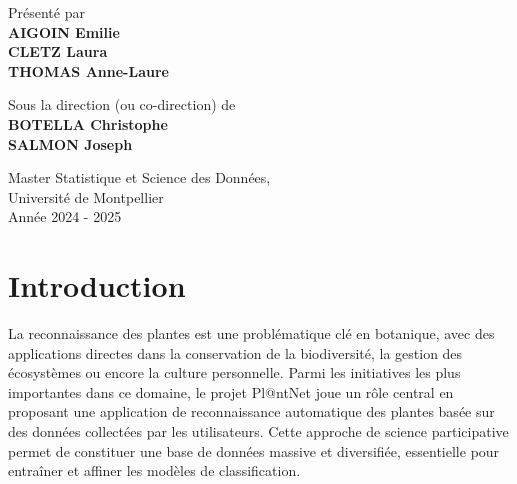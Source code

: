 \documentclass[a4paper,12pt]{article}
\begin{document}
\vfill
\begin{center}
Présenté par \\ \vspace{0.2cm}
    {\textbf{AIGOIN Emilie \\ \vspace{0.1cm} CLETZ Laura \\ \vspace{0.1cm} THOMAS Anne-Laure}}\\ \vspace{0.6cm}
    
Sous la direction (ou co-direction) de \\ \vspace{0.2cm}
    {\textbf{BOTELLA Christophe \\ \vspace{0.1cm} SALMON Joseph }}\\ \vspace{1.5cm}
    
    {\large Master Statistique et Science des Données, \\ \vspace{0.1cm} Université de Montpellier}\\ \vspace{0.6cm}
    {\large Année 2024 - 2025}
\end{center}

\thispagestyle{empty}

\newpage

\tableofcontents 

\newpage


\section{Introduction}

La reconnaissance des plantes est une problématique clé en botanique, avec des applications directes dans la conservation de la biodiversité, la gestion des écosystèmes ou encore la culture personnelle. Parmi les initiatives les plus importantes dans ce domaine, le projet Pl@ntNet joue un rôle central en proposant une application de reconnaissance automatique des plantes basée sur des données collectées par les utilisateurs. Cette approche de science participative permet de constituer une base de données massive et diversifiée, essentielle pour entraîner et affiner les modèles de classification.
\end{document}
